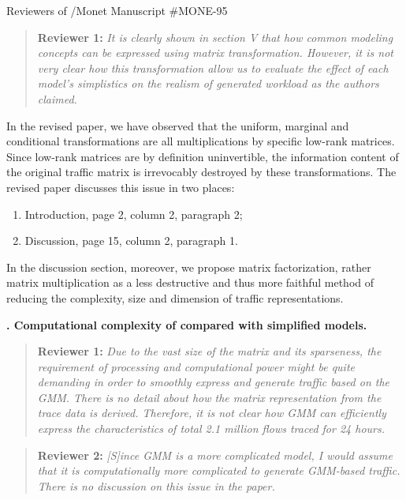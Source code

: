 \documentclass{letter}
\newcounter{topic}
\newcommand{\topic}[1]{
\addtocounter{topic}{1}
\textbf{\arabic{topic}. #1}
}
\newenvironment{reviewer}[1]%
{\begin{quote}\textbf{Reviewer #1:} \it}{\end{quote}}
\begin{document}
\begin{letter}{Reviewers of /Monet Manuscript \#MONE-95}
\begin{reviewer}{1}
It is clearly shown in section V that how common modeling concepts can be expressed using matrix transformation. However, it is not very clear how this transformation allow us to evaluate the effect of each model’s simplistics on the realism of generated workload as the authors claimed.
\end{reviewer}

In the revised paper, we have observed that the uniform, marginal and conditional transformations are all multiplications by specific low-rank matrices.
Since low-rank matrices are by definition uninvertible, the information content of the original traffic matrix is irrevocably destroyed by these transformations.
The revised paper discusses this issue in two places:
\begin{enumerate}
\item Introduction, page 2, column 2, paragraph 2;
\item Discussion, page 15, column 2, paragraph 1.
\end{enumerate}
In the discussion section, moreover, we propose matrix factorization, rather matrix multiplication as a less destructive and thus more faithful method of reducing the complexity, size and dimension of traffic representations.

\topic{Computational complexity of  compared with simplified models.}

\begin{reviewer}{1}
Due to the vast size of the matrix and its sparseness, the requirement of processing and computational power might be quite demanding in order to smoothly express and generate traffic based on the GMM. There is no detail about how the matrix representation from the trace data is derived. Therefore, it is not clear how GMM can efficiently express the 
characteristics of total 2.1 million flows traced for 24 hours.
\end{reviewer}

\begin{reviewer}{2}
[S]ince GMM is a more complicated model, I would assume that it is computationally more complicated to generate GMM-based traffic. There is no discussion on this issue in the paper.
\end{reviewer}


\end{letter}
\end{document}
